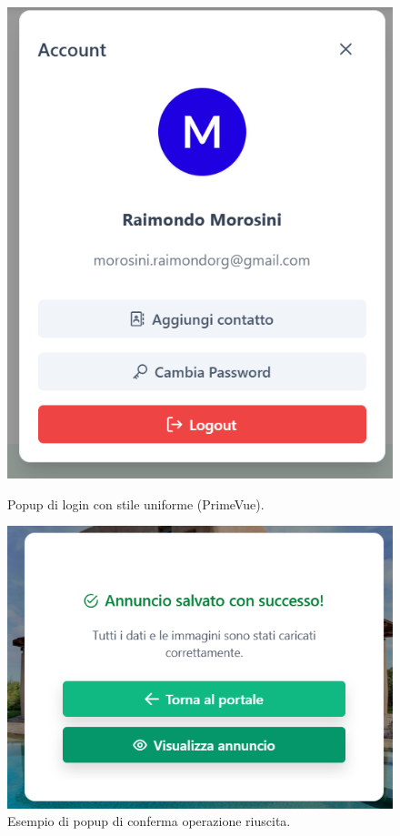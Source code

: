 \begin{figure}[H]
\centering
\begin{minipage}[t]{0.48\textwidth}
    \centering
    \includegraphics[width=\textwidth]{Immagini/Expert Reviews/Sito/PopupAccount.png}
    \caption{Popup di login con stile uniforme (PrimeVue).}
    \label{fig:popup-login}
\end{minipage}
\hfill
\begin{minipage}[t]{0.48\textwidth}
    \centering
    \includegraphics[width=\textwidth]{Immagini/Expert Reviews/Sito/CreazioneAnnuncioConSuccesso.png}
    \caption{Esempio di popup di conferma operazione riuscita.}
    \label{fig:popup-conferma}
\end{minipage}
\end{figure}

